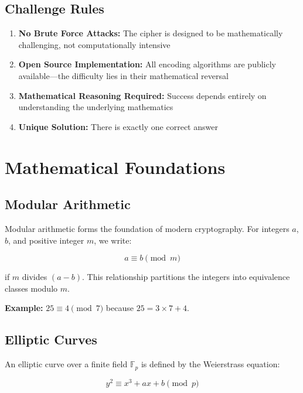 \documentclass[11pt,a4paper]{article}
\begin{document}
\subsection{Challenge Rules}

\begin{enumerate}
    \item \textbf{No Brute Force Attacks:} The cipher is designed to be mathematically challenging, not computationally intensive
    \item \textbf{Open Source Implementation:} All encoding algorithms are publicly available—the difficulty lies in their mathematical reversal
    \item \textbf{Mathematical Reasoning Required:} Success depends entirely on understanding the underlying mathematics
    \item \textbf{Unique Solution:} There is exactly one correct answer
\end{enumerate}

\section{Mathematical Foundations}

\subsection{Modular Arithmetic}

Modular arithmetic forms the foundation of modern cryptography. For integers $a$, $b$, and positive integer $m$, we write:

\begin{equation}
a \equiv b \pmod{m}
\end{equation}

if $m$ divides $(a - b)$. This relationship partitions the integers into equivalence classes modulo $m$.

\textbf{Example:} $25 \equiv 4 \pmod{7}$ because $25 = 3 \times 7 + 4$.

\subsection{Elliptic Curves}

An elliptic curve over a finite field $\mathbb{F}_p$ is defined by the Weierstrass equation:

\begin{equation}
y^2 \equiv x^3 + ax + b \pmod{p}
\end{equation}
\end{document}

